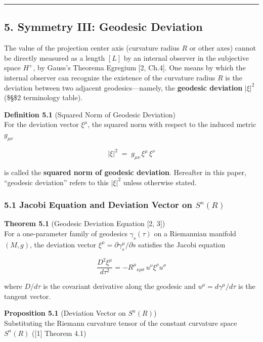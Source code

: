 \documentclass[a4paper,11pt]{article}
\theoremstyle{definition}
\begin{document}
\begin{center}\rule{0.5\linewidth}{0.5pt}\end{center}

\subsection{5. Symmetry III: Geodesic Deviation}\label{symmetry-iii-geodesic-deviation}

The value of the projection center axis (curvature radius \(R\) or other axes) cannot be directly measured as a length \([L]\) by an internal observer in the subjective space \(H^+\), by Gauss's Theorema Egregium {[}2, Ch.4{]}. One means by which the internal observer can recognize the existence of the curvature radius \(R\) is the deviation between two adjacent geodesics---namely, the \textbf{geodesic deviation} \(|\xi|^2\) (\$\S\$2 terminology table).

\textbf{Definition 5.1} (Squared Norm of Geodesic Deviation)\\
For the deviation vector \(\xi^\mu\), the squared norm with respect to the induced metric \(g_{\mu\nu}\)

\[|\xi|^2 \;=\; g_{\mu\nu}\,\xi^\mu\,\xi^\nu \tag{5.5}\]

is called the \textbf{squared norm of geodesic deviation}. Hereafter in this paper, ``geodesic deviation'' refers to this \(|\xi|^2\) unless otherwise stated.

\subsubsection{\texorpdfstring{5.1 Jacobi Equation and Deviation Vector on \(S^n(R)\)}{5.1 Jacobi Equation and Deviation Vector on S\^{}n(R)}}\label{jacobi-equation-and-deviation-vector-on-snr}

\textbf{Theorem 5.1} (Geodesic Deviation Equation {[}2, 3{]})\\
For a one-parameter family of geodesics \(\gamma_s(\tau)\) on a Riemannian manifold \((M, g)\), the deviation vector \(\xi^\mu = \partial \gamma_s^\mu / \partial s\) satisfies the Jacobi equation

\[\frac{D^2 \xi^\mu}{d\tau^2} = -R^\mu{}_{\nu\rho\sigma}\, u^\nu \xi^\rho u^\sigma \tag{5.1}\]

where \(D/d\tau\) is the covariant derivative along the geodesic and \(u^\mu = d\gamma^\mu/d\tau\) is the tangent vector.

\textbf{Proposition 5.1} (Deviation Vector on \(S^n(R)\))\\
Substituting the Riemann curvature tensor of the constant curvature space \(S^n(R)\) ({[}1{]} Theorem 4.1)
\end{document}
